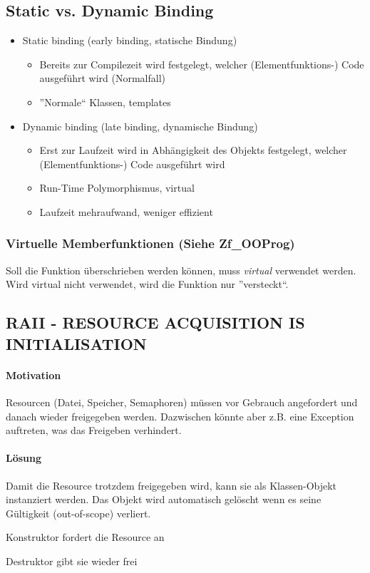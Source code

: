 \subsection{Static vs. Dynamic Binding}
\begin{itemize}
	\item Static binding (early binding, statische Bindung)
		\begin{itemize}
			\item Bereits zur Compilezeit wird festgelegt, welcher (Elementfunktions-) Code
				ausgeführt wird (Normalfall)
			\item ''Normale`` Klassen, templates
		\end{itemize}
	\item Dynamic binding (late binding, dynamische Bindung)
		\begin{itemize}
			\item Erst zur Laufzeit wird in Abhängigkeit des Objekts festgelegt, welcher
				(Elementfunktions-) Code ausgeführt wird
			\item Run-Time Polymorphismus, virtual
			\item Laufzeit mehraufwand, weniger effizient
		\end{itemize}
\end{itemize}

\subsubsection{Virtuelle Memberfunktionen (Siehe Zf\_OOProg)}
Soll die Funktion überschrieben werden können, muss \emph{virtual} verwendet werden.
Wird virtual nicht verwendet, wird die Funktion nur ''versteckt``.



\subsection[RAII]{RAII - RESOURCE ACQUISITION IS INITIALISATION}

\paragraph{Motivation}
Resourcen (Datei, Speicher, Semaphoren) müssen vor Gebrauch angefordert und danach wieder freigegeben werden.
Dazwischen könnte aber z.B. eine Exception auftreten, was das Freigeben verhindert.

\paragraph{Lösung}
Damit die Resource trotzdem freigegeben wird, kann sie als Klassen-Objekt instanziert werden. Das Objekt wird automatisch gelöscht wenn es seine Gültigkeit (out-of-scope) verliert.
\begin{compactitem}
	\item Konstruktor fordert die Resource an
	\item Destruktor gibt sie wieder frei
\end{compactitem}


